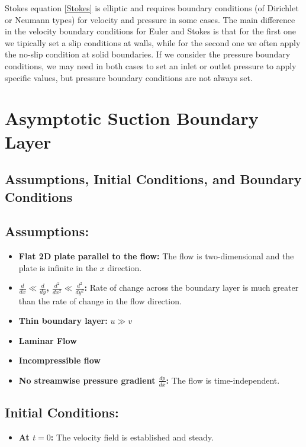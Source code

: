 \documentclass{article}
\begin{document}
Stokes equation \eqref{Stokes} is elliptic and requires boundary conditions (of Dirichlet or Neumann types) for velocity and pressure in some cases.
The main difference in the velocity boundary conditions for Euler and Stokes is that for the first one we tipically set a slip conditions at walls, while for the second one we often apply the no-slip condition at solid boundaries.
If we consider the pressure boundary conditions, we may need in both cases to set an inlet or outlet pressure to apply specific values, but pressure boundary conditions are not always set.

\section{Asymptotic Suction Boundary Layer}

\subsection{Assumptions, Initial Conditions, and Boundary Conditions}

\subsection{Assumptions:}
\begin{itemize}
    \item \textbf{Flat 2D plate parallel to the flow:} The flow is two-dimensional and the plate is infinite in the \(x\) direction.
    \item \textbf{\(\frac{d}{dx} \ll \frac{d}{dy}\), \(\frac{d^2}{dx^2} \ll \frac{d^2}{dy^2}\):} Rate of change across the boundary layer is much greater than the rate of change in the flow direction.
    \item \textbf{Thin boundary layer:} \(u \gg v\)
    \item \textbf{Laminar Flow}
    \item \textbf{Incompressible flow}
    \item \textbf{No streamwise pressure gradient \(\frac{dp}{dx}\):} The flow is time-independent.
\end{itemize}

\subsection{Initial Conditions:}
\begin{itemize}
    \item \textbf{At \(t = 0\):} The velocity field is established and steady.
\end{itemize}
\end{document}
